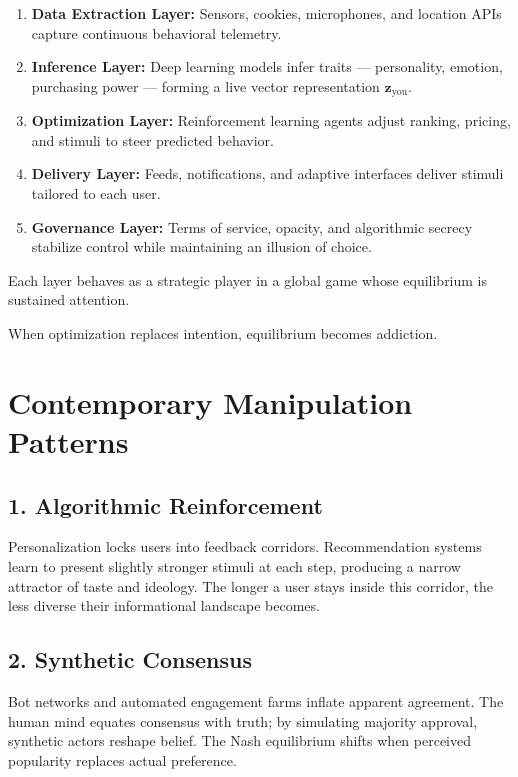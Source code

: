 \documentclass[12pt,twoside]{book}
\begin{document}
\begin{enumerate}[leftmargin=1.3em]
  \item \textbf{Data Extraction Layer:} Sensors, cookies, microphones, and location APIs capture continuous behavioral telemetry.
  \item \textbf{Inference Layer:} Deep learning models infer traits — personality, emotion, purchasing power — forming a live vector representation $\mathbf{z}_{\text{you}}$.
  \item \textbf{Optimization Layer:} Reinforcement learning agents adjust ranking, pricing, and stimuli to steer predicted behavior.
  \item \textbf{Delivery Layer:} Feeds, notifications, and adaptive interfaces deliver stimuli tailored to each user.
  \item \textbf{Governance Layer:} Terms of service, opacity, and algorithmic secrecy stabilize control while maintaining an illusion of choice.
\end{enumerate}

Each layer behaves as a strategic player in a global game whose equilibrium is sustained attention. \\

\begin{keyidea}
When optimization replaces intention, equilibrium becomes addiction.
\end{keyidea}

\section{Contemporary Manipulation Patterns}

\subsection*{1. Algorithmic Reinforcement}

Personalization locks users into feedback corridors.  
Recommendation systems learn to present slightly stronger stimuli at each step, producing a narrow attractor of taste and ideology.  
The longer a user stays inside this corridor, the less diverse their informational landscape becomes.

\subsection*{2. Synthetic Consensus}

Bot networks and automated engagement farms inflate apparent agreement.  
The human mind equates consensus with truth; by simulating majority approval, synthetic actors reshape belief.  
The Nash equilibrium shifts when perceived popularity replaces actual preference.
\end{document}
